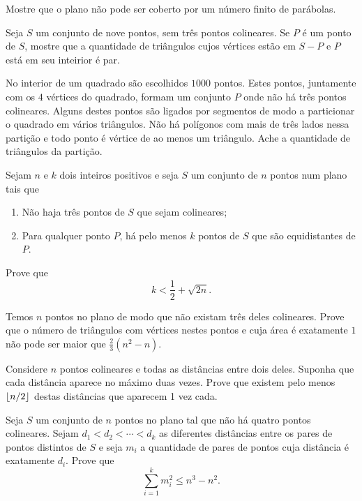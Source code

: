 \documentclass[10pt,a4paper]{article}
\begin{document}
	\begin{prob}[Turquia]
		Mostre que o plano não pode ser coberto por um número finito de parábolas.
	\end{prob}
	\begin{prob}[Ibero 2002]
		Seja $S$ um conjunto de nove pontos, sem três pontos colineares. Se $P$ é um ponto de $S$, mostre que a quantidade de triângulos cujos vértices estão em $S - {P}$ e $P$ está em seu inteirior é par.
	\end{prob}
	\begin{prob}
		No interior de um quadrado são escolhidos $1000$ pontos. Estes pontos, juntamente com os $4$ vértices do quadrado, formam um conjunto $P$ onde não há três pontos colineares. Alguns destes pontos são ligados por segmentos de modo a particionar o quadrado em vários triângulos. Não há polígonos com mais de três lados nessa partição e todo ponto é vértice de ao menos um triângulo. Ache a quantidade de triângulos da partição.
	\end{prob}
	\begin{prob}[IMO 1989]
		Sejam $n$ e $k$ dois inteiros positivos e seja $S$ um conjunto de $n$ pontos num plano tais que
		\begin{enumerate}[label = (\roman*)]
			\item Não haja três pontos de $S$ que sejam colineares;
			\item Para qualquer ponto $P$, há pelo menos $k$ pontos de $S$ que são equidistantes de $P$.
		\end{enumerate}

		Prove que $$k < \frac{1}{2} + \sqrt{2n}.$$
	\end{prob}
	\begin{prob}[Irã 2010]
		Temos $n$ pontos no plano de modo que não existam três deles colineares. Prove que o número de triângulos com vértices nestes pontos e cuja área é exatamente $1$ não pode ser maior que $\frac{2}{3}(n^2 - n)$.
	\end{prob}
	\begin{prob}
		Considere $n$ pontos colineares e todas as distâncias entre dois deles. Suponha que cada distância aparece no máximo duas vezes. Prove que existem pelo menos $\left \lfloor{n/2}\right \rfloor$ destas distâncias que aparecem 1 vez cada.
	\end{prob}
	\begin{prob}[China 2011]
		Seja $S$ um conjunto de $n$ pontos no plano tal que não há quatro pontos colineares. Sejam $d_1 < d_2 < \cdots < d_k$ as diferentes distâncias entre os pares de pontos distintos de $S$ e seja $m_i$ a quantidade de pares de pontos cuja distância é exatamente $d_i$. Prove que $$\sum_{i = 1}^{k} m_i^2 \le n^3 - n^2.$$
	\end{prob}
\end{document}
